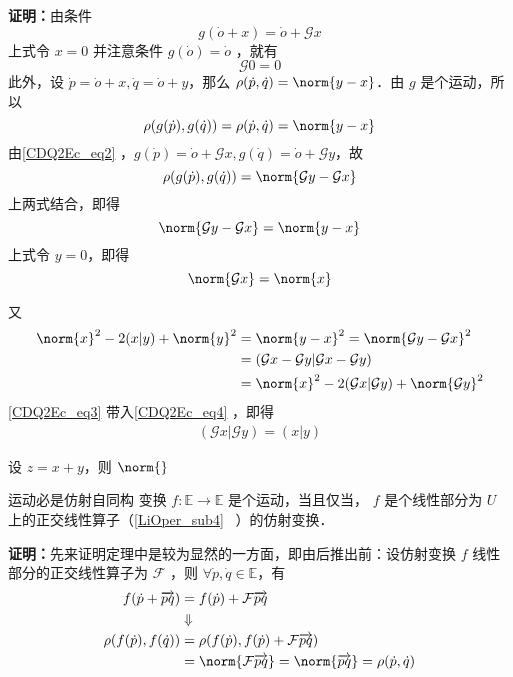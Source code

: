 \textbf{证明：}由条件
\begin{equation}\label{CDQ2Ec_eq2}
g(\dot o+x)=\dot o+\mathcal G x
\end{equation}
上式令 $x=0$ 并注意条件 $g(\dot o)=\dot o$ ，就有
\begin{equation}
\mathcal G 0=0
\end{equation}
此外，设 $\dot p=\dot o+x,\dot q=\dot o+y$，那么 $\rho(\dot p,\dot q)=\norm{y-x}$．由 $g$ 是个运动，所以
\begin{equation}
\rho(g(\dot p),g(\dot q))=\rho(\dot p,\dot q)=\norm{y-x}
\end{equation}
由\autoref{CDQ2Ec_eq2} ，$g(\dot p)=\dot o+\mathcal G x, g(\dot q)=\dot o+\mathcal G y$，故
\begin{equation}
\rho(g(\dot p),g(\dot q))=\norm{\mathcal Gy-\mathcal Gx}
\end{equation}
上两式结合，即得
\begin{equation}
\norm{\mathcal Gy-\mathcal Gx}=\norm{y-x}
\end{equation}
上式令 $y=0$，即得
\begin{equation}\label{CDQ2Ec_eq3}
\norm{\mathcal G x}=\norm{x}
\end{equation}

又
\begin{equation}\label{CDQ2Ec_eq4}
\begin{aligned}
\norm{x}^2-2(x|y)+\norm{y}^2&=\norm{y-x}^2=\norm{\mathcal G y-\mathcal G x}^2\\
&=(\mathcal G x-\mathcal G y|\mathcal G x-\mathcal G y)\\
&=\norm{x}^2-2(\mathcal G x|\mathcal G y)+\norm{\mathcal G y}^2
\end{aligned}
\end{equation}
\autoref{CDQ2Ec_eq3} 带入\autoref{CDQ2Ec_eq4} ，即得
\begin{equation}
\begin{aligned}
(\mathcal G x|\mathcal G y)=(x|y)
\end{aligned}
\end{equation}

设 $z=x+y$，则 $\norm{}$


\begin{theorem}{运动必是仿射自同构}
变换 $f:\mathbb E\rightarrow\mathbb E$ 是个运动，当且仅当， $f$ 是个线性部分为 $U$ 上的正交线性算子（\autoref{LiOper_sub4}~ ）的仿射变换．
\end{theorem}
\textbf{证明：}先来证明定理中是较为显然的一方面，即由后推出前：设仿射变换 $f$ 线性部分的正交线性算子为 $\mathcal F$ ，则 $\forall \dot p,\dot q\in\mathbb E$，有
\begin{equation}
\begin{aligned}
f(\dot p+\overrightarrow{pq})&=f(\dot p)+\mathcal F\overrightarrow{pq}\\
&\Downarrow\\
\rho(f(\dot p),f(\dot q))&=\rho(f(\dot p),f(\dot p)+\mathcal F\overrightarrow{pq})\\
&=\norm{\mathcal F\overrightarrow{pq}}=\norm{\overrightarrow{pq}}=\rho(\dot p,\dot q)
\end{aligned}
\end{equation}

